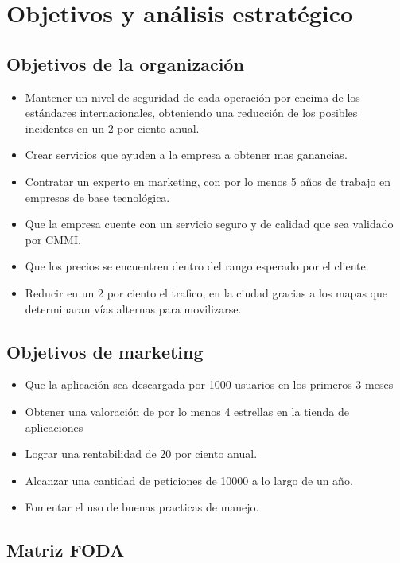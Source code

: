 \chapter{Objetivos y análisis estratégico}

\section{Objetivos de la organización}

\begin{itemize}
\item Mantener un nivel de seguridad de cada operación por encima de los estándares internacionales, obteniendo una reducción de los posibles incidentes en un 2 por ciento anual.
\item Crear servicios que ayuden a la empresa a obtener mas ganancias.  
\item Contratar un experto en marketing, con por lo menos 5 años de trabajo en empresas de base tecnológica.
\item Que la empresa cuente con un servicio seguro y de calidad que sea validado por CMMI.
\item Que los precios se encuentren dentro del rango esperado por el cliente.
\item Reducir en un 2 por ciento el trafico, en la ciudad gracias a los mapas que determinaran vías alternas para movilizarse.
\end{itemize}

\section{Objetivos de marketing}

\begin{itemize}
\item Que la aplicación sea descargada por 1000 usuarios en los primeros 3 meses
\item Obtener una valoración de por lo menos 4 estrellas en la tienda de aplicaciones
\item Lograr una rentabilidad de 20 por ciento anual.
\item Alcanzar una cantidad de peticiones de 10000 a lo largo de un año.
\item Fomentar el uso de buenas practicas de manejo.
\end{itemize}

\section{Matriz FODA}

